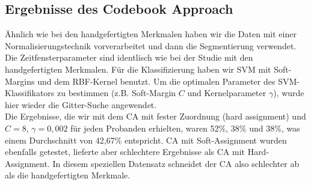 \subsection{Ergebnisse des Codebook Approach} \label{ergebnisse-codebook-approach-subsec}


Ähnlich wie bei den handgefertigten Merkmalen haben wir die Daten mit einer Normalisierungstechnik vorverarbeitet und dann die Segmentierung verwendet. Die Zeitfensterparameter sind identlisch wie bei der Studie mit den handgefertigten Merkmalen.
Für die Klassifizierung haben wir SVM mit Soft-Margins und dem RBF-Kernel benutzt. 
Um die optimalen Parameter des SVM-Klassifikators zu bestimmen (z.B. Soft-Margin $C$ und Kernelparameter $\gamma$), wurde hier wieder die Gitter-Suche angewendet. \\


Die Ergebnisse, die wir mit dem CA mit fester Zuordnung (hard assignment) und $C = 8$, $\gamma = 0,002$ für jeden Probanden erhielten, waren 52\%, 38\% und 38\%, was einem Durchschnitt von 42,67\% entspricht. CA mit Soft-Assignment wurden ebenfalls getestet, lieferte aber schlechtere Ergebnisse als CA mit Hard-Assignment. In diesem speziellen Datensatz schneidet der CA also schlechter ab als die handgefertigten Merkmale.